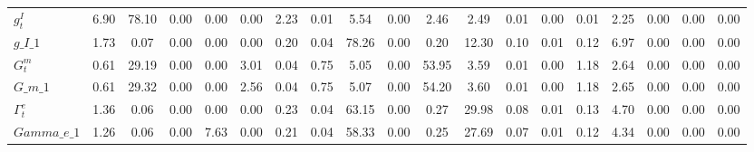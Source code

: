 \begin{center}
\begin{longtable}{lcccccccccccccccccc}
$ g^I_t             $	 & 	             6.90	 & 	            78.10	 & 	             0.00	 & 	             0.00	 & 	             0.00	 & 	             2.23	 & 	             0.01	 & 	             5.54	 & 	             0.00	 & 	             2.46	 & 	             2.49	 & 	             0.01	 & 	             0.00	 & 	             0.01	 & 	             2.25	 & 	             0.00	 & 	             0.00	 & 	             0.00 \\ 
$g\_I\_1            $	 & 	             1.73	 & 	             0.07	 & 	             0.00	 & 	             0.00	 & 	             0.00	 & 	             0.20	 & 	             0.04	 & 	            78.26	 & 	             0.00	 & 	             0.20	 & 	            12.30	 & 	             0.10	 & 	             0.01	 & 	             0.12	 & 	             6.97	 & 	             0.00	 & 	             0.00	 & 	             0.00 \\ 
$ G^m_t             $	 & 	             0.61	 & 	            29.19	 & 	             0.00	 & 	             0.00	 & 	             3.01	 & 	             0.04	 & 	             0.75	 & 	             5.05	 & 	             0.00	 & 	            53.95	 & 	             3.59	 & 	             0.01	 & 	             0.00	 & 	             1.18	 & 	             2.64	 & 	             0.00	 & 	             0.00	 & 	             0.00 \\ 
$G\_m\_1            $	 & 	             0.61	 & 	            29.32	 & 	             0.00	 & 	             0.00	 & 	             2.56	 & 	             0.04	 & 	             0.75	 & 	             5.07	 & 	             0.00	 & 	            54.20	 & 	             3.60	 & 	             0.01	 & 	             0.00	 & 	             1.18	 & 	             2.65	 & 	             0.00	 & 	             0.00	 & 	             0.00 \\ 
$ \Gamma^e_t        $	 & 	             1.36	 & 	             0.06	 & 	             0.00	 & 	             0.00	 & 	             0.00	 & 	             0.23	 & 	             0.04	 & 	            63.15	 & 	             0.00	 & 	             0.27	 & 	            29.98	 & 	             0.08	 & 	             0.01	 & 	             0.13	 & 	             4.70	 & 	             0.00	 & 	             0.00	 & 	             0.00 \\ 
$Gamma\_e\_1        $	 & 	             1.26	 & 	             0.06	 & 	             0.00	 & 	             7.63	 & 	             0.00	 & 	             0.21	 & 	             0.04	 & 	            58.33	 & 	             0.00	 & 	             0.25	 & 	            27.69	 & 	             0.07	 & 	             0.01	 & 	             0.12	 & 	             4.34	 & 	             0.00	 & 	             0.00	 & 	             0.00 \\ 

\end{longtable}
\end{center}
